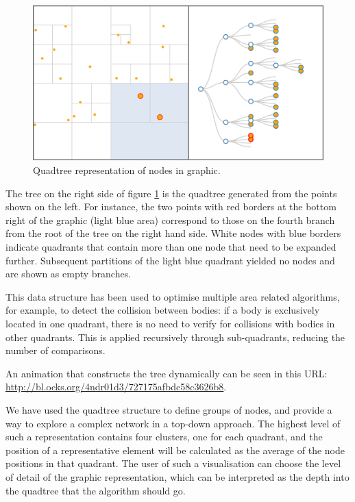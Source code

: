 \begin{figure}[ht]
\centering
\includegraphics[width=\textwidth]{figures/quadtree.png}
\caption[Quadtree representation of nodes in graphic.]{Quadtree representation of nodes in graphic. 
\label{fig:quadtree}}
\end{figure}


The tree on the right side of figure \ref{fig:quadtree} is the quadtree generated from the points shown on the left. For instance, the two points with red borders at the bottom right of the graphic (light blue area) correspond to those on the fourth branch from the root of the tree on the right hand side. White nodes with blue borders indicate quadrants that contain more than one node that need to be expanded further. Subsequent partitions  of the light blue quadrant yielded no nodes and are shown as empty branches.

This data structure has been used to optimise multiple area related algorithms, for example, to detect the collision between bodies: if a body is exclusively located in one quadrant, there is no need to verify for collisions with bodies in other quadrants. This is applied recursively through sub-quadrants, reducing the number of comparisons.

An animation that constructs the tree dynamically can be seen in this URL: \url{http://bl.ocks.org/4ndr01d3/727175afbdc58c3626b8}.

We have used the quadtree structure to define groups of nodes, and provide a way to explore a complex network in a top-down approach. The highest level of such a representation contains four clusters, one for each quadrant, and the position of a representative element will be calculated as the average of the node positions in that quadrant. The user of such a visualisation can choose the level of detail of the graphic representation, which can be interpreted as the depth into the quadtree that the algorithm should go.

